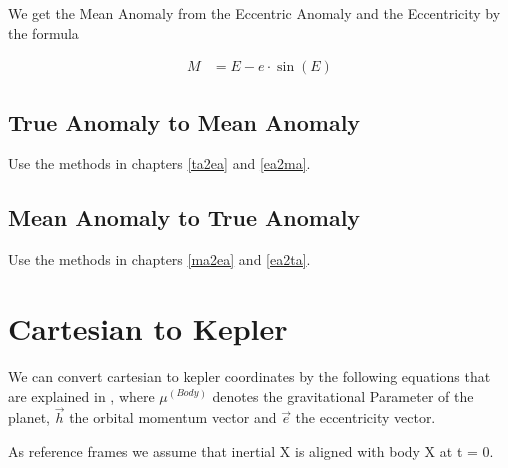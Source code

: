 \documentclass[11pt]{report}
\newcommand{\oa}[1]{\overrightarrow{#1}}
\begin{document}
We get the Mean Anomaly from the Eccentric Anomaly and the
Eccentricity by the formula

\begin{align}
M & = E - e\cdot \sin(E)
\end{align}

\subsection{True Anomaly to Mean Anomaly}

Use the methods in chapters \ref{ta2ea} and \ref{ea2ma}.

\subsection{Mean Anomaly to True Anomaly}

Use the methods in chapters \ref{ma2ea} and \ref{ea2ta}.

\section{Cartesian to Kepler}

We can convert cartesian to kepler coordinates by the following
equations that are explained in \cite{RSCK}, where $\mu^{(Body)}$
denotes the gravitational Parameter of the planet, $\oa{h}$ the
 orbital momentum vector and $\oa{e}$ the
eccentricity vector.

As reference frames we assume that inertial X is aligned with body X
at t = 0.
\end{document}
